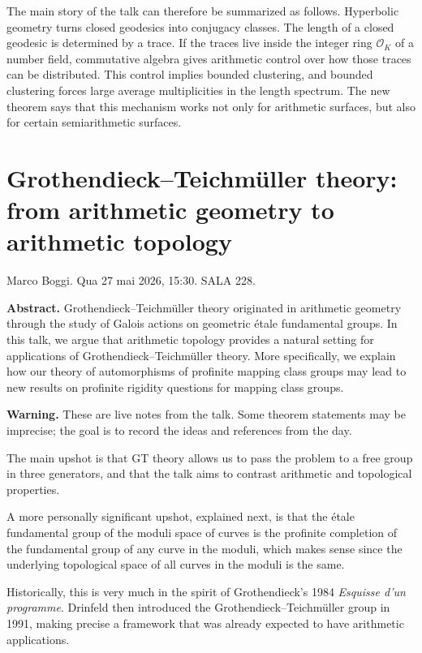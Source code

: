 \medskip\noindent
The main story of the talk can therefore be
summarized as follows. Hyperbolic geometry
turns closed geodesics into conjugacy classes.
The length of a closed geodesic is determined
by a trace. If the traces live inside the
integer ring $\mathcal{O}_K$ of a number
field, commutative algebra gives arithmetic
control over how those traces can be
distributed. This control implies bounded
clustering, and bounded clustering forces
large average multiplicities in the length
spectrum. The new theorem says that this
mechanism works not only for arithmetic
surfaces, but also for certain
semiarithmetic surfaces.

\section{Grothendieck--Teichm\"uller theory: from arithmetic geometry to arithmetic topology}
\label{section-grothendieck-teichmuller-arithmetic-topology}

\noindent
Marco Boggi.
Qua 27 mai 2026, 15:30.
SALA 228.

\medskip\noindent
{\bf Abstract.}
Grothendieck--Teichm\"uller theory originated
in arithmetic geometry through the study of
Galois actions on geometric \'etale
fundamental groups. In this talk, we argue
that arithmetic topology provides a natural
setting for applications of
Grothendieck--Teichm\"uller theory. More
specifically, we explain how our theory of
automorphisms of profinite mapping class
groups may lead to new results on profinite
rigidity questions for mapping class groups.

\medskip\noindent
{\bf Warning.}
These are live notes from the talk.
Some theorem
statements may be imprecise; the goal is to
record the ideas and references from the day.\medskip\noindent

\medskip\noindent
The main upshot is that GT theory allows us
to pass the problem to a free group in three
generators, and that the talk aims to
contrast arithmetic and topological
properties.

A more personally significant 
upshot, explained next,
is that the étale fundamental
group of the moduli space of curves
is the profinite completion of
the fundamental group of any curve in 
the moduli, which makes sense since the
underlying topological space of all curves
in the moduli is the same.

\medskip\noindent
Historically, this is very much in the spirit
of Grothendieck's 1984 \emph{Esquisse d'un
programme}. Drinfeld then introduced the
Grothendieck--Teichm\"uller group in 1991,
making precise a framework that was already
expected to have arithmetic applications.

